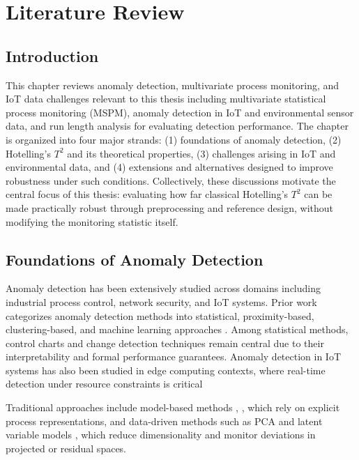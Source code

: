 \clearpage
\section{Literature Review}

\subsection{Introduction}

This chapter reviews anomaly detection, multivariate process monitoring, and IoT data challenges relevant to this thesis including multivariate statistical process monitoring (\ac{MSPM}), anomaly detection in \ac{IoT} and environmental sensor data, and run length analysis for evaluating detection performance. The chapter is organized into four major strands: (1) foundations of anomaly detection, (2) Hotelling’s $T^2$ and its theoretical properties, (3) challenges arising in \ac{IoT} and environmental data, and (4) extensions and alternatives designed to improve robustness under such conditions. Collectively, these discussions motivate the central focus of this thesis: evaluating how far classical Hotelling’s $T^2$ can be made practically robust through preprocessing and reference design, without modifying the monitoring statistic itself.

\subsection{Foundations of Anomaly Detection}

Anomaly detection has been extensively studied across domains including industrial process control, network security, and \ac{IoT} systems. Prior work categorizes anomaly detection methods into statistical, proximity-based, clustering-based, and machine learning approaches \cite{Chandola2009} \cite{Ahmed2016}. Among statistical methods, control charts and change detection techniques remain central due to their interpretability and formal performance guarantees.
Anomaly detection in IoT systems has also been studied in edge computing contexts, where real-time detection under resource constraints is critical \cite{Mishra2021}

Traditional approaches include model-based methods \cite{Venkatasubramanian2003}, , which rely on explicit process representations, and data-driven methods such as \ac{PCA} \cite{Jolliffe2002, Gray2017} and latent variable models \cite{Kourti2005}, which reduce dimensionality and monitor deviations in projected or residual spaces.


